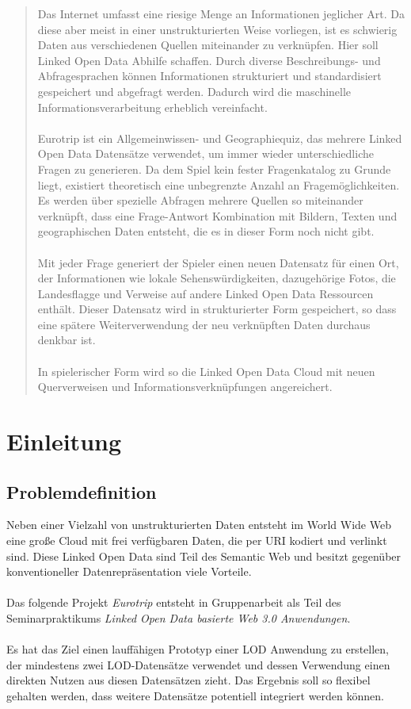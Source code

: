 \documentclass[a4paper, 11pt]{article}
\begin{document}
\begin{abstract}Das Internet umfasst eine riesige Menge an Informationen jeglicher Art. Da diese aber meist in einer unstrukturierten Weise vorliegen, ist es schwierig Daten aus verschiedenen Quellen miteinander zu verknüpfen. Hier soll Linked Open Data Abhilfe schaffen. Durch diverse Beschreibungs- und Abfragesprachen können Informationen strukturiert und standardisiert gespeichert und abgefragt werden. Dadurch wird die maschinelle Informationsverarbeitung erheblich vereinfacht.\\\\
Eurotrip ist ein Allgemeinwissen- und Geographiequiz, das mehrere Linked Open Data Datensätze verwendet, um immer wieder unterschiedliche Fragen zu generieren. Da dem Spiel kein fester Fragenkatalog zu Grunde liegt, existiert theoretisch eine unbegrenzte Anzahl an Fragemöglichkeiten. Es werden über spezielle Abfragen mehrere Quellen so miteinander verknüpft, dass eine Frage-Antwort Kombination mit Bildern, Texten und geographischen Daten entsteht, die es in dieser Form noch nicht gibt.\\\\
Mit jeder Frage generiert der Spieler einen neuen Datensatz für einen Ort, der Informationen wie lokale Sehenswürdigkeiten, dazugehörige Fotos, die Landesflagge und Verweise auf andere Linked Open Data Ressourcen enthält. Dieser Datensatz wird in strukturierter Form gespeichert, so dass eine spätere Weiterverwendung der neu verknüpften Daten durchaus denkbar ist. \\\\
In spielerischer Form wird so die Linked Open Data Cloud mit neuen Querverweisen und Informationsverknüpfungen angereichert.
\end{abstract}
\thispagestyle{empty}
\newpage
\tableofcontents
\setcounter{page}{1}

\newpage
\setcounter{page}{1}
\section{Einleitung}
\subsection{Problemdefinition}
Neben einer Vielzahl von unstrukturierten Daten entsteht im World Wide Web eine große Cloud mit frei verfügbaren Daten,  die per URI kodiert und verlinkt sind. Diese Linked Open Data sind Teil des Semantic Web und besitzt gegenüber konventioneller Datenrepräsentation viele Vorteile.\\\\
Das folgende Projekt \textit{Eurotrip} entsteht in Gruppenarbeit als Teil des Seminarpraktikums \textit{Linked Open Data basierte Web 3.0 Anwendungen}. \\\\
Es hat das Ziel einen lauffähigen Prototyp einer LOD Anwendung zu erstellen, der mindestens zwei LOD-Datensätze verwendet und dessen Verwendung einen direkten Nutzen aus diesen Datensätzen zieht. Das Ergebnis soll so flexibel gehalten werden, dass weitere Datensätze potentiell integriert werden können. 
\end{document}

